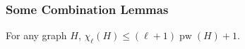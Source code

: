 \documentclass[kpfonts]{patmorin}
\DeclareMathOperator{\pw}{pw}
\newcommand{\lrn}{\chi_{\ell}}
\theoremstyle{named}
\begin{document}
%
%

\subsubsection{Some Combination Lemmas}

\begin{lem}\label{pathwidth}
    For any graph $H$, $\lrn(H)\le (\ell+1)\pw(H) + 1$.
\end{lem}
\end{document}
